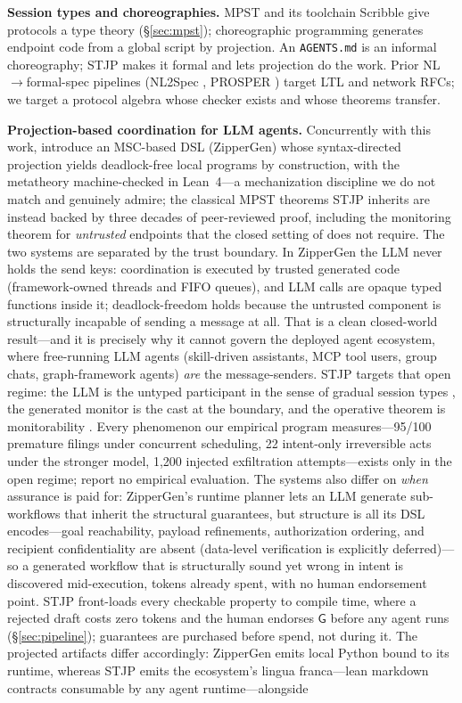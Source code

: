 \documentclass{article}
\newcommand{\gtG}{\mathsf{G}}
\newcommand{\stjp}{\textsc{STJP}}
\begin{document}
\textbf{Session types and choreographies.} MPST \citep{hyc08,scalas19} and its toolchain Scribble \citep{scribble} give protocols a type theory (\S\ref{sec:mpst}); choreographic programming \citep{montesi23,carbone13} generates endpoint code from a global script by projection. An \texttt{AGENTS.md} is an informal choreography; \stjp{} makes it formal and lets projection do the work. Prior NL$\to$formal-spec pipelines (NL2Spec \citep{nl2spec}, PROSPER \citep{prosper}) target LTL and network RFCs; we target a protocol algebra whose checker exists and whose theorems transfer.

\textbf{Projection-based coordination for LLM agents.} Concurrently with this work, \citet{bollig26} introduce an MSC-based DSL (ZipperGen) whose syntax-directed projection yields deadlock-free local programs by construction, with the metatheory machine-checked in Lean~4---a mechanization discipline we do not match and genuinely admire; the classical MPST theorems \stjp{} inherits are instead backed by three decades of peer-reviewed proof, including the monitoring theorem for \emph{untrusted} endpoints \citep{bocchi13} that the closed setting of \citet{bollig26} does not require. The two systems are separated by the trust boundary. In ZipperGen the LLM never holds the send keys: coordination is executed by trusted generated code (framework-owned threads and FIFO queues), and LLM calls are opaque typed functions inside it; deadlock-freedom holds because the untrusted component is structurally incapable of sending a message at all. That is a clean closed-world result---and it is precisely why it cannot govern the deployed agent ecosystem, where free-running LLM agents (skill-driven assistants, MCP tool users, group chats, graph-framework agents) \emph{are} the message-senders. \stjp{} targets that open regime: the LLM is the untyped participant in the sense of gradual session types \citep{igarashi17}, the generated monitor is the cast at the boundary, and the operative theorem is monitorability \citep{bocchi13}. Every phenomenon our empirical program measures---95/100 premature filings under concurrent scheduling, 22 intent-only irreversible acts under the stronger model, 1{,}200 injected exfiltration attempts---exists only in the open regime; \citet{bollig26} report no empirical evaluation. The systems also differ on \emph{when} assurance is paid for: ZipperGen's runtime planner lets an LLM generate sub-workflows that inherit the structural guarantees, but structure is all its DSL encodes---goal reachability, payload refinements, authorization ordering, and recipient confidentiality are absent (data-level verification is explicitly deferred)---so a generated workflow that is structurally sound yet wrong in intent is discovered mid-execution, tokens already spent, with no human endorsement point. \stjp{} front-loads every checkable property to compile time, where a rejected draft costs zero tokens and the human endorses $\gtG$ before any agent runs (\S\ref{sec:pipeline}); guarantees are purchased before spend, not during it. The projected artifacts differ accordingly: ZipperGen emits local Python bound to its runtime, whereas \stjp{} emits the ecosystem's lingua franca---lean markdown contracts consumable by any agent runtime---alongside 
\end{document}
